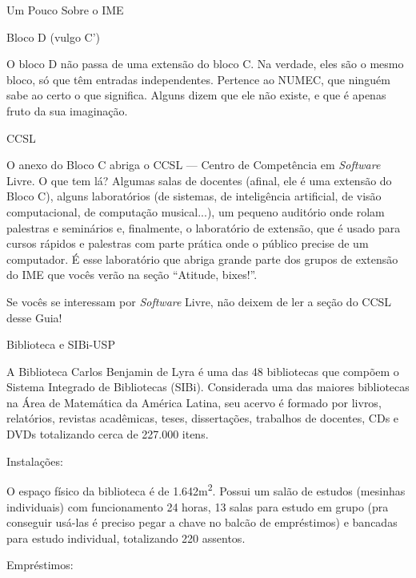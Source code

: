 \begin{secao}{Um Pouco Sobre o IME}
\begin{subsecao}{Bloco D (vulgo C')}

O bloco D não passa de uma extensão do bloco C. Na verdade, eles são o mesmo bloco,
só que têm entradas independentes. Pertence ao NUMEC, que ninguém sabe ao certo
o que significa. Alguns dizem que ele não existe, e que é apenas fruto da sua
imaginação.

\end{subsecao}

\begin{subsecao}{CCSL}

O anexo do Bloco C abriga o CCSL --- Centro de Competência em \textit{Software}
Livre. O que tem lá? Algumas salas de docentes (afinal, ele é uma extensão do
Bloco C), alguns laboratórios (de sistemas, de inteligência artificial,
de visão computacional, de computação musical...), um pequeno auditório
onde rolam palestras e seminários e, finalmente, o laboratório de extensão,
que é usado para cursos rápidos e palestras com parte prática onde o público
precise de um computador. É esse laboratório que abriga grande parte dos grupos
de extensão do IME que vocês verão na seção ``Atitude, bixes!''.

Se vocês se interessam por \textit{Software} Livre, não deixem de ler a seção
do CCSL desse Guia!

\end{subsecao}

\begin{subsecao}{Biblioteca e SIBi-USP}

A Biblioteca Carlos Benjamin de Lyra é uma das 48 bibliotecas que compõem o Sistema Integrado de Bibliotecas (SIBi). Considerada uma das maiores bibliotecas na Área de Matemática da América Latina, seu acervo é formado por livros, relatórios, revistas acadêmicas, teses, dissertações, trabalhos de docentes, CDs e DVDs totalizando cerca de 227.000 itens. 

\begin{subsubsecao}{Instalações:}

O espaço físico da biblioteca é de 1.642m\textsuperscript{2}. Possui um salão de estudos (mesinhas individuais) com funcionamento 24 horas, 13 salas para estudo em grupo (pra conseguir usá-las é preciso pegar a chave no balcão de empréstimos) e bancadas para estudo individual, totalizando 220 assentos.
\end{subsubsecao}

\begin{subsubsecao}{Empréstimos:}


\end{subsubsecao}
\end{subsecao}
\end{secao}
